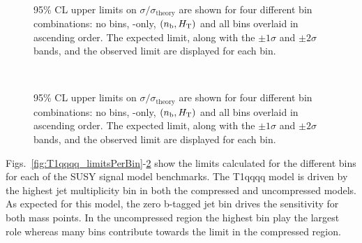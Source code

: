 \begin{figure}[h!]
\begin{center}
{            \label{fig:T2tt_uncomp2_limitsPerBin}
        } \\
        \caption{
            95\% CL upper limits on $\sigma/\sigma_{\mathrm{theory}}$ are shown
            for four different bin combinations: no bins, \scalht-only,
            $(n_{\text{b}}, \mbox{$H_\text{T}$})$ and all bins overlaid in ascending order. The
            expected limit, along with the $\pm 1\sigma$ and $\pm 2\sigma$ bands,
            and the observed limit are displayed for each bin.
        }
        \label{fig:T2tt_limitsPerBin}
    \end{center}
\end{figure}

\begin{figure}[h!]
    \begin{center}
         \\
        \caption{
            95\% CL upper limits on $\sigma/\sigma_{\mathrm{theory}}$ are shown
            for four different bin combinations: no bins, \scalht-only,
            $(n_{\text{b}}, \mbox{$H_\text{T}$})$ and all bins overlaid in ascending order. The
            expected limit, along with the $\pm 1\sigma$ and $\pm 2\sigma$ bands,
            and the observed limit are displayed for each bin.
        }
        \label{fig:T2cc_limitsPerBin}
    \end{center}
\end{figure}


Figs.~\ref{fig:T1qqqq_limitsPerBin}-\ref{fig:T2cc_limitsPerBin} show the limits
calculated for the different bins for each of the SUSY signal model benchmarks.
The T1qqqq model is driven by the highest jet multiplicity bin in both the
compressed and uncompressed models. As expected for this model, the zero
b-tagged jet bin drives the sensitivity for both mass points. In the
uncompressed region the highest \scalht bin play the largest role whereas many
\scalht bins contribute towards the limit in the compressed region.

